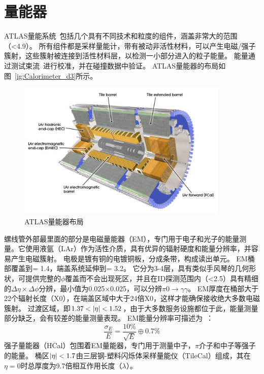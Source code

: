 \section{量能器}
ATLAS量能系统~\cite{ATLAS_Collaboration_2008}包括几个具有不同技术和粒度的组件，涵盖非常大的范围（\abseta <4.9）。 所有组件都是采样量能计，带有被动非活性材料，可以产生电磁/强子簇射，这些簇射被连接到活性材料层，以检测一小部分进入的粒子能量。 能量通过测试束流~\cite{4436305,Davidek_2009}进行校准，并在碰撞数据中验证。 ATLAS量能器的布局如图~\ref{ig:Calorimeter_d3}所示。
\begin{figure}[h]
\begin{center}
\includegraphics[width=0.9\textwidth]{fig/Calorimeter_d3.pdf}
\caption{ATLAS量能器布局} \label{fig:Calorimeter_d3}
\end{center}
\end{figure}
螺线管外部最里面的部分是电磁量能器（EM），专门用于电子和光子的能量测量。它使用液氩（LAr）作为活性介质，具有优异的辐射硬度和能量分辨率，并容易产生电磁簇射。
电极是镀有铜的电镀铜板，分成条带，构成读出单元。 EM桶部覆盖到\abseta = 1.4，端盖系统延伸到\abseta = 3.2。 它分为3-4层，具有类似手风琴的几何形状，可提供完整的$\phi$覆盖而不会出现死区，并且在ID探测范围内（\abseta <2.5）具有精细的$\Delta \eta\times\Delta\phi$分辨，最小值为0.025$\times$0.025，可以分辨$\pi0\rightarrow \gamma\gamma$。
EM厚度在桶部大于22个辐射长度（X0），在端盖区域中大于24倍X0，这样才能确保接收绝大多数电磁簇射。 过渡区域，即$1.37<\abseta<1.52$，由于大多数服务设施都位于此，能量测量部分缺乏，会有较差的能量测量表现。 EM能量分辨率可描述为~\cite{ATLAS_Collaboration_2008}：
\begin{equation}
\frac{\sigma_{E}}{E}=\frac{10\%}{\sqrt{E}}\oplus0.7\%
\end{equation}
强子量能器（HCal）包围着EM量能器，专门用于测量中子，$\pi$介子和中子等强子的能量。 桶区$|\eta|<1.7$由三层钢-塑料闪烁体采样量能仪（TileCal）组成，其在$\eta = 0$时总厚度为9.7倍相互作用长度（$\lambda$）。

